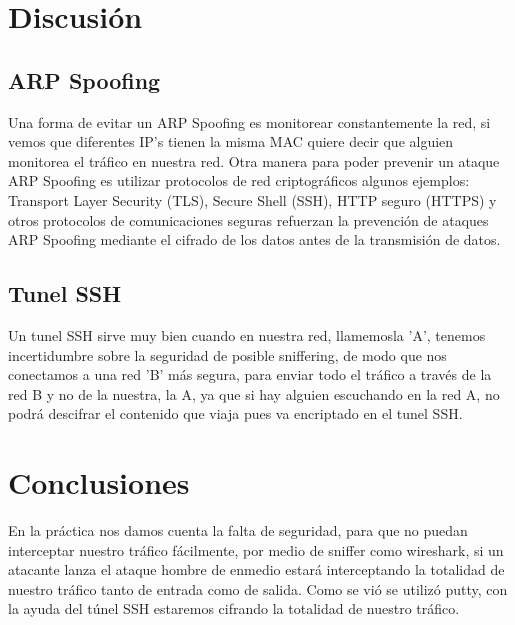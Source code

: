 \documentclass{article}
\begin{document}
\section{Discusi\'on}

\subsection{ARP Spoofing}
Una forma de evitar un ARP Spoofing es monitorear constantemente la red, si vemos que diferentes IP's tienen la misma MAC quiere decir que alguien monitorea el tr\'afico en nuestra red. Otra manera para poder prevenir un ataque ARP Spoofing es utilizar protocolos de red criptogr\'aficos algunos ejemplos: Transport Layer Security (TLS), Secure Shell (SSH), HTTP seguro (HTTPS) y otros protocolos de comunicaciones seguras refuerzan la prevenci\'on de ataques ARP Spoofing mediante el cifrado de los datos antes de la transmisi\'on de datos.

\subsection{Tunel SSH}

Un tunel SSH sirve muy bien cuando en nuestra red, llamemosla 'A', tenemos incertidumbre sobre la seguridad de posible sniffering, de modo que nos conectamos a una red 'B' m\'as segura, para enviar todo el tr\'afico a trav\'es de la red B y no de la nuestra, la A, ya que si hay alguien escuchando en la red A, no podr\'a descifrar el contenido que viaja pues va encriptado en el tunel SSH.

\section{Conclusiones}
En la pr\'actica nos damos cuenta la falta de seguridad, para que no puedan interceptar nuestro tr\'afico f\'acilmente, por medio de sniffer como wireshark, 
si un atacante lanza el ataque hombre de enmedio estar\'a interceptando la totalidad de nuestro tr\'afico tanto de entrada como de salida. Como se vi\'o se utiliz\'o putty, con la ayuda del túnel SSH estaremos cifrando la totalidad de nuestro tráfico.
\end{document}

